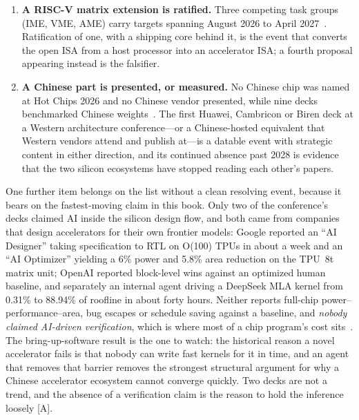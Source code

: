 \begin{enumerate}
  \item \textbf{A RISC-V matrix extension is ratified.} Three competing task groups (IME, VME, AME) carry targets spanning August 2026 to April 2027~\cite{hc2026-riscv-profiles}. Ratification of one, with a shipping core behind it, is the event that converts the open ISA from a host processor into an accelerator ISA; a fourth proposal appearing instead is the falsifier.
  \item \textbf{A Chinese part is presented, or measured.} No Chinese chip was named at Hot Chips 2026 and no Chinese vendor presented, while nine decks benchmarked Chinese weights~\cite{hc2026-china-bench}. The first Huawei, Cambricon or Biren deck at a Western architecture conference---or a Chinese-hosted equivalent that Western vendors attend and publish at---is a datable event with strategic content in either direction, and its continued absence past 2028 is evidence that the two silicon ecosystems have stopped reading each other's papers.
\end{enumerate}

One further item belongs on the list without a clean resolving event, because it bears on the fastest-moving claim in this book. Only two of the conference's decks claimed AI inside the silicon design flow, and both came from companies that design accelerators for their own frontier models: Google reported an ``AI Designer'' taking specification to RTL on O(100) TPUs in about a week and an ``AI Optimizer'' yielding a 6\% power and 5.8\% area reduction on the TPU~8t matrix unit; OpenAI reported block-level wins against an optimized human baseline, and separately an internal agent driving a DeepSeek MLA kernel from 0.31\% to 88.94\% of roofline in about forty hours. Neither reports full-chip power--performance--area, bug escapes or schedule saving against a baseline, and \emph{nobody claimed AI-driven verification}, which is where most of a chip program's cost sits~\cite{hc2026-ai-design}. The bring-up-software result is the one to watch: the historical reason a novel accelerator fails is that nobody can write fast kernels for it in time, and an agent that removes that barrier removes the strongest structural argument for why a Chinese accelerator ecosystem cannot converge quickly. Two decks are not a trend, and the absence of a verification claim is the reason to hold the inference loosely [A].
